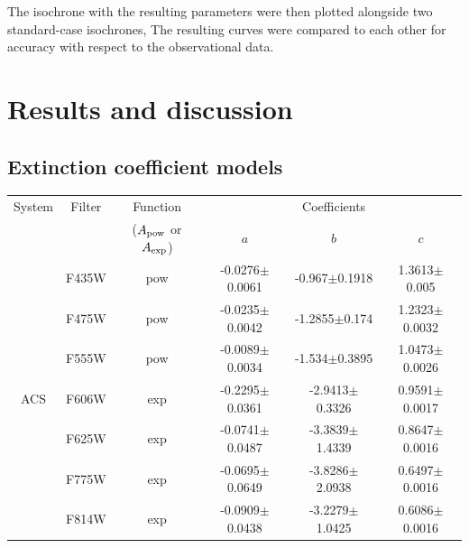 \documentclass[12pt, a4paper]{report}
\begin{document}
The isochrone with the resulting parameters were then plotted alongside two standard-case isochrones, The resulting curves were compared to each other for accuracy with respect to the observational data.



\chapter{Results and discussion}
\section{Extinction coefficient models} \label{coef_models}

\begin{table}
\begin{center}
\begin{tabular}{cccccc}
\hline
System & Filter &  Function & & Coefficients & \\
 & & ($A_{\textnormal{pow}}$ or $A_{\textnormal{exp}}$) & $a$ & $b$ & $c$ \\
\hline

& F435W & pow & -0.0276$\pm$0.0061 & -0.967$\pm$0.1918 & 1.3613$\pm$0.005 \\
& F475W & pow & -0.0235$\pm$0.0042 & -1.2855$\pm$0.174 & 1.2323$\pm$0.0032 \\
& F555W & pow & -0.0089$\pm$0.0034 & -1.534$\pm$0.3895 & 1.0473$\pm$0.0026 \\
ACS & F606W & exp & -0.2295$\pm$0.0361 & -2.9413$\pm$0.3326 & 0.9591$\pm$0.0017 \\
& F625W & exp & -0.0741$\pm$0.0487 & -3.3839$\pm$1.4339 & 0.8647$\pm$0.0016 \\
& F775W & exp & -0.0695$\pm$0.0649 & -3.8286$\pm$2.0938 & 0.6497$\pm$0.0016 \\
& F814W & exp & -0.0909$\pm$0.0438 & -3.2279$\pm$1.0425 & 0.6086$\pm$0.0016 \\ \hline



\end{tabular}
\end{center}
\end{table}
\end{document}
